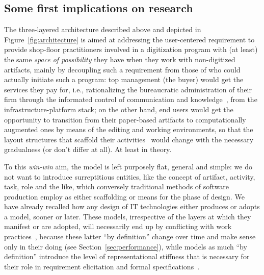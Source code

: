 \documentclass{article}
\begin{document}


\subsection{Some first implications on research}
\label{subsec:implications}

The three-layered architecture described above and depicted in Figure~\ref{fig:architecture} is aimed at addressing the user-centered requirement to provide shop-floor practitioners involved in a digitization program with (at least) the same \emph{space of possibility} they have when they work with non-digitized artifacts, mainly by decoupling such a requirement from those of who could actually initiate such a program: top management (the buyer) would get the services they pay for, i.e., rationalizing the bureaucratic administration of their firm through the informated control of communication and knowledge~\citep{zuboff_age_1988,yates_control_1993}, from the infrastructure-platform stack; on the other hand, end users would get the opportunity to transition from their paper-based artifacts to computationally augmented ones by means of the editing and working environments, so that the layout structures that scaffold their activities~\citep{orlikowski_material_2006} would change with the necessary gradualness (or don't differ at all). At least in theory.

To this \emph{win-win} aim, the model is left purposely flat, general and simple: we do not want to introduce surreptitious entities, like the concept of artifact, activity, task, role and the like, which conversely traditional methods of software production employ as either scaffolding or means for the phase of design. We have already recalled how any design of IT technologies either produces or adopts a model, sooner or later. These models, irrespective of the layers at which they manifest or are adopted, will necessarily end up by conflicting with work practices~\citep[for a recent account on this phenomenon see, e.g.~][]{morrison_multi-disciplinary_2011}, because these latter ``by definition'' change over time and make sense only in their doing (see Section~\ref{sec:performance}), while models as much ``by definition'' introduce the level of representational stiffness that is necessary for their role in requirement elicitation and formal specifications~\citep[e.g., ][]{bowers_janus_1991,robinson_questioning_1991,bannon_cscw_1994}.
\end{document}
